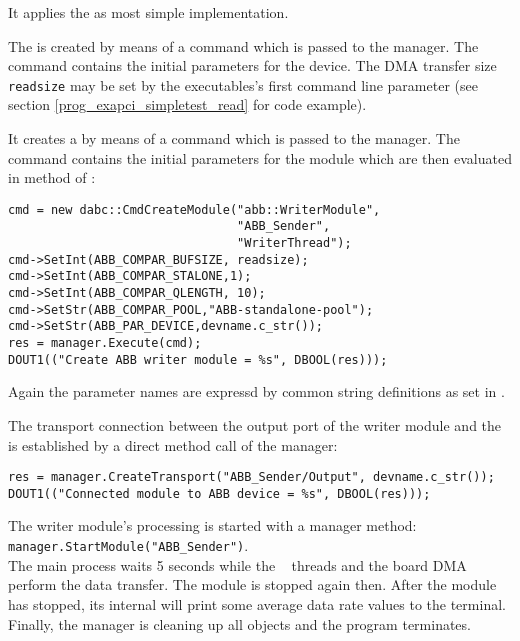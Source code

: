 \begin{compactenum} 

\item It applies the  as most simple
 implementation.

\item The  is created by means of a command
 which is passed to the manager. The 
command contains the initial parameters for the device.
The DMA transfer size {\tt readsize} may be set by
the executables's first command line parameter
(see section \ref{prog_exapci_simpletest_read} for code example).

\item It creates a  by means of a command
 which is passed to the manager. The 
command contains the initial
parameters for the module which are then evaluated in 
method  of :
\begin{small}
\begin{verbatim} 
cmd = new dabc::CmdCreateModule("abb::WriterModule",
                                "ABB_Sender", 
                                "WriterThread");
cmd->SetInt(ABB_COMPAR_BUFSIZE, readsize);
cmd->SetInt(ABB_COMPAR_STALONE,1);
cmd->SetInt(ABB_COMPAR_QLENGTH, 10);
cmd->SetStr(ABB_COMPAR_POOL,"ABB-standalone-pool");
cmd->SetStr(ABB_PAR_DEVICE,devname.c_str());
res = manager.Execute(cmd);
DOUT1(("Create ABB writer module = %s", DBOOL(res)));
\end{verbatim} 
\end{small}
Again the parameter names are expressd by 
common string definitions as set in . 

\item The transport connection between the output port of the writer module and
the  is established by a direct method call of the manager:
\begin{small}
\begin{verbatim}
res = manager.CreateTransport("ABB_Sender/Output", devname.c_str());
DOUT1(("Connected module to ABB device = %s", DBOOL(res)));
\end{verbatim}  
\end{small}

\item The writer module's processing 
is started with a manager method: \\
{\tt manager.StartModule("ABB\_Sender")}. \\
The main process waits 5 seconds while the \dabc~ threads
and the board DMA perform the data transfer. The module is stopped
again then. After the module has stopped, its internal 
will print some average data rate values to the terminal.
Finally, the manager is cleaning up all objects
and the program terminates.


\end{compactenum} 

